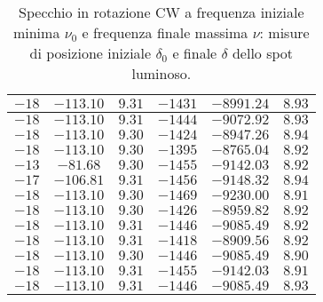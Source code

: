 \documentclass[]{article}
\begin{document}
\begin{table}[H]
\begin{tabular}{||c|c|c||c|c|c||}
            $-18 $ & $-113.10 $ & $ 9.31 $ & $ -1431 $ & $ -8991.24 $ & $  8.93 $ \\\hline
            $-18 $ & $-113.10 $ & $ 9.31 $ & $ -1444 $ & $ -9072.92 $ & $  8.93 $ \\\hline
            $-18 $ & $-113.10 $ & $ 9.30 $ & $ -1424 $ & $ -8947.26 $ & $  8.94 $ \\\hline
            $-18 $ & $-113.10 $ & $ 9.30 $ & $ -1395 $ & $ -8765.04 $ & $  8.92 $ \\\hline
            $-13 $ & $-81.68  $ & $ 9.30 $ & $ -1455 $ & $ -9142.03 $ & $  8.92 $ \\\hline
            $-17 $ & $-106.81 $ & $ 9.31 $ & $ -1456 $ & $ -9148.32 $ & $  8.94 $ \\\hline
            $-18 $ & $-113.10 $ & $ 9.30 $ & $ -1469 $ & $ -9230.00 $ & $  8.91 $ \\\hline
            $-18 $ & $-113.10 $ & $ 9.30 $ & $ -1426 $ & $ -8959.82 $ & $  8.92 $ \\\hline
            $-18 $ & $-113.10 $ & $ 9.31 $ & $ -1446 $ & $ -9085.49 $ & $  8.92 $ \\\hline
            $-18 $ & $-113.10 $ & $ 9.31 $ & $ -1418 $ & $ -8909.56 $ & $  8.92 $ \\\hline
            $-18 $ & $-113.10 $ & $ 9.30 $ & $ -1446 $ & $ -9085.49 $ & $  8.90 $ \\\hline
            $-18 $ & $-113.10 $ & $ 9.31 $ & $ -1455 $ & $ -9142.03 $ & $  8.91 $ \\\hline
            $-18 $ & $-113.10 $ & $ 9.31 $ & $ -1446 $ & $ -9085.49 $ & $  8.93 $ \\\hline
        \end{tabular}
        \caption{Specchio in rotazione CW a frequenza iniziale minima $\nu_0$ e frequenza finale massima $\nu$: misure di posizione iniziale $\delta_0$ e finale $\delta$ dello spot luminoso.}
        \label{CW_min_max-delta-omega}
    \end{table}
\end{document}
